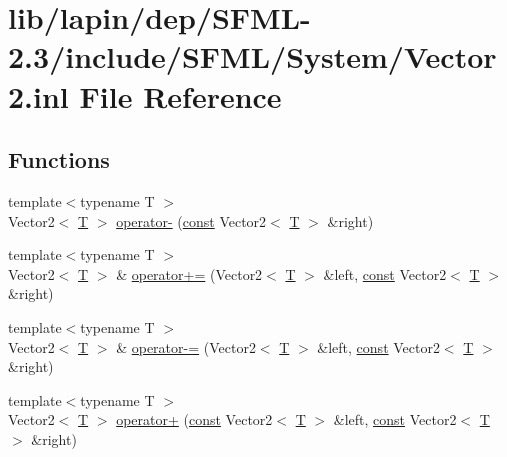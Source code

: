 \hypertarget{lapin_2dep_2_s_f_m_l-2_83_2include_2_s_f_m_l_2_system_2_vector2_8inl}{\section{lib/lapin/dep/\-S\-F\-M\-L-\/2.3/include/\-S\-F\-M\-L/\-System/\-Vector2.inl File Reference}
\label{lapin_2dep_2_s_f_m_l-2_83_2include_2_s_f_m_l_2_system_2_vector2_8inl}
}
\subsection*{Functions}
\begin{DoxyCompactItemize}
\item 
{\footnotesize template$<$typename T $>$ }\\Vector2$<$ \hyperlink{curses_8priv_8h_a5ef253115820acf7d27f3c5c3b02a0f0}{T} $>$ \hyperlink{lapin_2dep_2_s_f_m_l-2_83_2include_2_s_f_m_l_2_system_2_vector2_8inl_af6be5729d510689ad3bda16e2ee1052e}{operator-\/} (\hyperlink{term__entry_8h_a57bd63ce7f9a353488880e3de6692d5a}{const} Vector2$<$ \hyperlink{curses_8priv_8h_a5ef253115820acf7d27f3c5c3b02a0f0}{T} $>$ \&right)
\item 
{\footnotesize template$<$typename T $>$ }\\Vector2$<$ \hyperlink{curses_8priv_8h_a5ef253115820acf7d27f3c5c3b02a0f0}{T} $>$ \& \hyperlink{lapin_2dep_2_s_f_m_l-2_83_2include_2_s_f_m_l_2_system_2_vector2_8inl_a52734531787801fca563b63877cf8855}{operator+=} (Vector2$<$ \hyperlink{curses_8priv_8h_a5ef253115820acf7d27f3c5c3b02a0f0}{T} $>$ \&left, \hyperlink{term__entry_8h_a57bd63ce7f9a353488880e3de6692d5a}{const} Vector2$<$ \hyperlink{curses_8priv_8h_a5ef253115820acf7d27f3c5c3b02a0f0}{T} $>$ \&right)
\item 
{\footnotesize template$<$typename T $>$ }\\Vector2$<$ \hyperlink{curses_8priv_8h_a5ef253115820acf7d27f3c5c3b02a0f0}{T} $>$ \& \hyperlink{lapin_2dep_2_s_f_m_l-2_83_2include_2_s_f_m_l_2_system_2_vector2_8inl_a6dc66f95d609a2280bc5d0e8dc1871ec}{operator-\/=} (Vector2$<$ \hyperlink{curses_8priv_8h_a5ef253115820acf7d27f3c5c3b02a0f0}{T} $>$ \&left, \hyperlink{term__entry_8h_a57bd63ce7f9a353488880e3de6692d5a}{const} Vector2$<$ \hyperlink{curses_8priv_8h_a5ef253115820acf7d27f3c5c3b02a0f0}{T} $>$ \&right)
\item 
{\footnotesize template$<$typename T $>$ }\\Vector2$<$ \hyperlink{curses_8priv_8h_a5ef253115820acf7d27f3c5c3b02a0f0}{T} $>$ \hyperlink{lapin_2dep_2_s_f_m_l-2_83_2include_2_s_f_m_l_2_system_2_vector2_8inl_a629b6b51cf4ef3d9bef1b471096535c1}{operator+} (\hyperlink{term__entry_8h_a57bd63ce7f9a353488880e3de6692d5a}{const} Vector2$<$ \hyperlink{curses_8priv_8h_a5ef253115820acf7d27f3c5c3b02a0f0}{T} $>$ \&left, \hyperlink{term__entry_8h_a57bd63ce7f9a353488880e3de6692d5a}{const} Vector2$<$ \hyperlink{curses_8priv_8h_a5ef253115820acf7d27f3c5c3b02a0f0}{T} $>$ \&right)

\end{DoxyCompactItemize}
